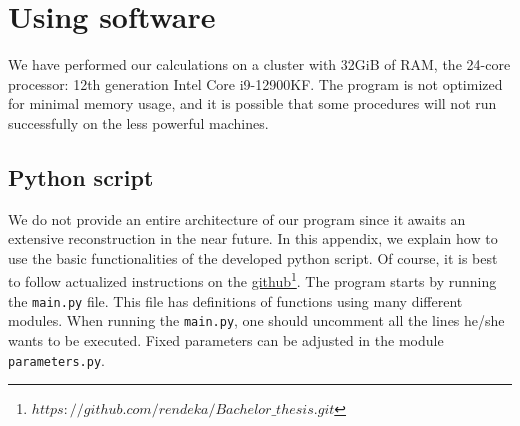 \chapter{Using software}

We have performed our calculations on a cluster with 32GiB of RAM, the 24-core processor: 12th generation Intel Core i9-12900KF. The program is not optimized for minimal memory usage, and it is possible that some procedures will not run successfully on the less powerful machines.

\section{Python script}
\label{sec:code}
We do not provide an entire architecture of our program since it awaits an extensive reconstruction in the near future. In this appendix, we explain how to use the basic functionalities of the developed python script. Of course, it is best to follow actualized instructions on the \href{https://github.com/rendeka/Bachelor_thesis.git}{github\footnote{\href{https://github.com/rendeka/Bachelor_thesis.git}{$https://github.com/rendeka/Bachelor\_thesis.git$}}}. The program starts by running the \verb|main.py| file. This file has definitions of functions using many different modules. When running the \verb|main.py|, one should uncomment all the lines he/she wants to be executed. Fixed parameters can be adjusted in the module \verb|parameters.py|.

